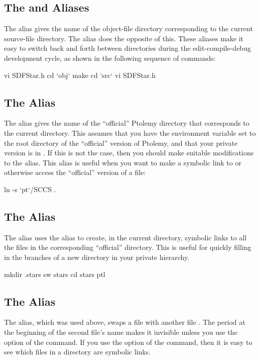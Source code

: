 \subsection{The \protect{} and \protect{} Aliases}

The  alias gives the name of the object-file directory
corresponding to the current source-file directory.  The 
alias does the opposite of this.  These aliases make it easy to switch
back and forth between directories during the edit-compile-debug
development cycle, as shown in the following sequence of
commands:
\begin{example}
vi SDFStar.h
cd `obj`
make
cd `src`
vi SDFStar.h
\end{example}

\subsection{The \protect{} Alias}

The  alias gives the name of the ``official''
Ptolemy directory that corresponds to the current directory.  This assumes
that you have the environment variable  set to the root
directory of
the ``official'' version of Ptolemy,
and that your
private version is in .  If this is not the case, then
you should make suitable modifications to the  alias.  This
alias is useful when you want to make a symbolic link to or otherwise
access the ``official'' version of a file:
\begin{example}
ln -s `pt`/SCCS .
\end{example}

\subsection{The \protect{} Alias}
\label{ptl.alias}

The  alias uses the  alias to create, in the current
directory, symbolic links to all the files in the corresponding
``official'' directory.  This is useful for quickly filling in the
branches of a new directory in your private hierarchy.
\begin{example}
mkdir .stars
sw stars
cd stars
ptl
\end{example}

\subsection{The \protect{} Alias}
The  alias, which was used above, swaps a file 
with another file .  The period at the beginning of the
second file's name makes it invisible unless you use the 
option of the  command.  If you use the  option of
the  command, then it is easy to see which files in a
directory are symbolic links.

